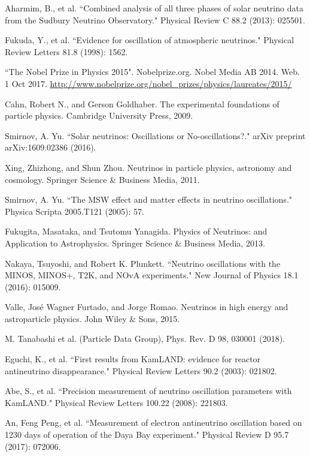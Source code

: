 \documentclass[preprint,12pt]{elsarticle}
\numberwithin{equation}{section}
\begin{document}
\begin{thebibliography}{00}
 Aharmim, B., et al. ``Combined analysis of all three phases of solar neutrino data from the Sudbury Neutrino Observatory." Physical Review C 88.2 (2013): 025501.

 Fukuda, Y., et al. ``Evidence for oscillation of atmospheric neutrinos." Physical Review Letters 81.8 (1998): 1562.

 ``The Nobel Prize in Physics 2015". Nobelprize.org. Nobel Media AB 2014. Web. 1 Oct 2017. \url{http://www.nobelprize.org/nobel_prizes/physics/laureates/2015/}

 Cahn, Robert N., and Gerson Goldhaber. The experimental foundations of particle physics. Cambridge University Press, 2009.

 Smirnov, A. Yu. ``Solar neutrinos: Oscillations or No-oscillations?." arXiv preprint arXiv:1609.02386 (2016).

 Xing, Zhizhong, and Shun Zhou. Neutrinos in particle physics, astronomy and cosmology. Springer Science \& Business Media, 2011.

 Smirnov, A. Yu. ``The MSW effect and matter effects in neutrino oscillations." Physica Scripta 2005.T121 (2005): 57.

 Fukugita, Masataka, and Tsutomu Yanagida. Physics of Neutrinos: and Application to Astrophysics. Springer Science \& Business Media, 2013.

 Nakaya, Tsuyoshi, and Robert K. Plunkett. ``Neutrino oscillations with the MINOS, MINOS+, T2K, and NOvA experiments." New Journal of Physics 18.1 (2016): 015009.

 Valle, José Wagner Furtado, and Jorge Romao. Neutrinos in high energy and astroparticle physics. John Wiley \& Sons, 2015.

 M. Tanabashi et al. (Particle Data Group), Phys. Rev. D 98, 030001 (2018).

 Eguchi, K., et al. ``First results from KamLAND: evidence for reactor antineutrino disappearance." Physical Review Letters 90.2 (2003): 021802.

 Abe, S., et al. ``Precision measurement of neutrino oscillation parameters with KamLAND." Physical Review Letters 100.22 (2008): 221803.

 An, Feng Peng, et al. ``Measurement of electron antineutrino oscillation based on 1230 days of operation of the Daya Bay experiment." Physical Review D 95.7 (2017): 072006.


\end{thebibliography}
\end{document}

